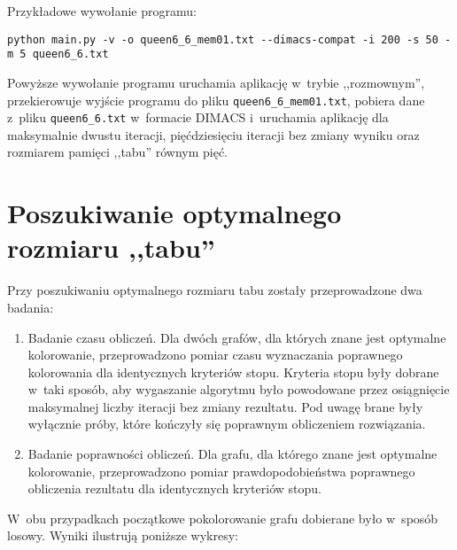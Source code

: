 \documentclass[a4paper,10pt]{article}
\begin{document}
\noindent Przykładowe wywołanie programu:

\begin{verbatim}
python main.py -v -o queen6_6_mem01.txt --dimacs-compat -i 200 -s 50 -m 5 queen6_6.txt
\end{verbatim}

\noindent Powyższe wywołanie programu uruchamia aplikację w~trybie ,,rozmownym'', przekierowuje wyjście programu do pliku \verb+queen6_6_mem01.txt+, pobiera dane z~pliku \verb+queen6_6.txt+ w~formacie DIMACS i~uruchamia aplikację dla maksymalnie dwustu iteracji, pięćdziesięciu iteracji bez zmiany wyniku oraz rozmiarem pamięci ,,tabu'' równym pięć.

\section*{Poszukiwanie optymalnego rozmiaru ,,tabu''}

Przy poszukiwaniu optymalnego rozmiaru tabu zostały przeprowadzone dwa badania:

\begin{enumerate}
    \item Badanie czasu obliczeń. Dla dwóch grafów, dla których znane jest optymalne kolorowanie, przeprowadzono pomiar czasu wyznaczania poprawnego kolorowania dla identycznych kryteriów stopu. Kryteria stopu były dobrane w~taki sposób, aby wygaszanie algorytmu było powodowane przez osiągnięcie maksymalnej liczby iteracji bez zmiany rezultatu. Pod uwagę brane były wyłącznie próby, które kończyły się poprawnym obliczeniem rozwiązania.
    \item Badanie poprawności obliczeń. Dla grafu, dla którego znane jest optymalne kolorowanie, przeprowadzono pomiar prawdopodobieństwa poprawnego obliczenia rezultatu dla identycznych kryteriów stopu.
\end{enumerate}

\noindent W~obu przypadkach początkowe pokolorowanie grafu dobierane było w~sposób losowy. Wyniki ilustrują poniższe wykresy:
\end{document}
